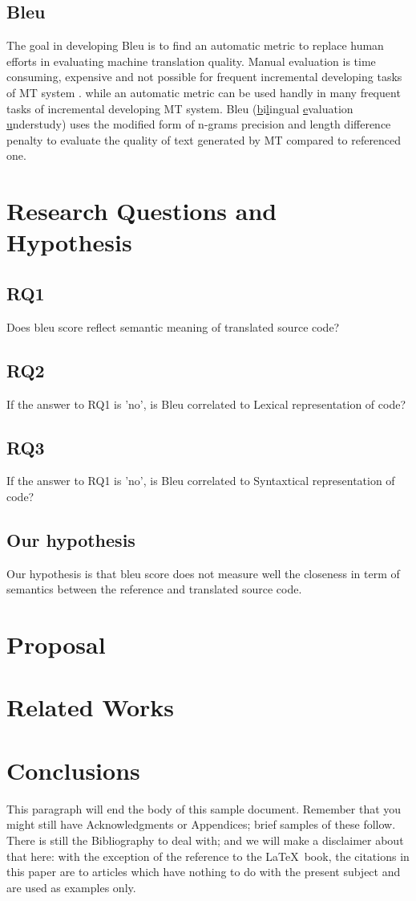 \subsection{Bleu}
The goal in developing Bleu is to find an automatic metric to replace human efforts in evaluating machine translation quality. Manual evaluation is time consuming, expensive and not possible for frequent incremental developing tasks of MT system \cite{Papineni2002}. while an automatic metric can be used handly in many frequent tasks of incremental developing MT system. 
Bleu (\underline{b}i\underline{l}ingual \underline{e}valuation \underline{u}nderstudy) uses the modified form of n-grams precision and length difference penalty to evaluate the quality of text generated by MT compared to referenced one.

\section{Research Questions and Hypothesis}
\subsection{RQ1}
Does bleu score reflect semantic meaning of translated source code?
\subsection{RQ2} 
If the answer to RQ1 is 'no', is Bleu correlated to Lexical representation of code?
\subsection{RQ3} 
If the answer to RQ1 is 'no', is Bleu correlated to Syntaxtical representation of code?
\subsection{Our hypothesis}
Our hypothesis is that bleu score does not measure well the closeness in term of semantics between the reference and translated source code. 



\section{Proposal}
\section{Related Works}

\section{Conclusions}
This paragraph will end the body of this sample document.
Remember that you might still have Acknowledgments or
Appendices; brief samples of these
follow.  There is still the Bibliography to deal with; and
we will make a disclaimer about that here: with the exception
of the reference to the \LaTeX\ book, the citations in
this paper are to articles which have nothing to
do with the present subject and are used as
examples only.



